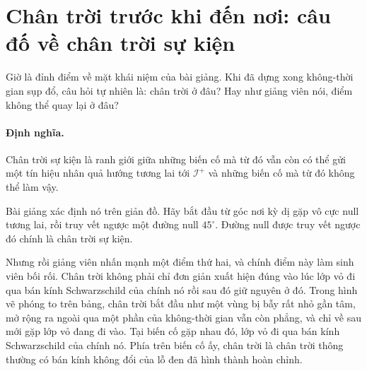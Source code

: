 \begin{classroomqa}
\end{classroomqa}

\section{Chân trời trước khi đến nơi: câu đố về chân trời sự kiện}

Giờ là đỉnh điểm về mặt khái niệm của bài giảng. Khi đã dựng xong không-thời gian sụp đổ, câu hỏi tự nhiên là: chân trời ở đâu? Hay như giảng viên nói, điểm không thể quay lại ở đâu?

\paragraph{Định nghĩa.} Chân trời sự kiện là ranh giới giữa những biến cố mà từ đó vẫn còn có thể gửi một tín hiệu nhân quả hướng tương lai tới \(\mathcal{I}^+\) và những biến cố mà từ đó không thể làm vậy.

Bài giảng xác định nó trên giản đồ. Hãy bắt đầu từ góc nơi kỳ dị gặp vô cực null tương lai, rồi truy vết ngược một đường null \(45^\circ\). Đường null được truy vết ngược đó chính là chân trời sự kiện.

Nhưng rồi giảng viên nhấn mạnh một điểm thứ hai, và chính điểm này làm sinh viên bối rối. Chân trời không phải chỉ đơn giản xuất hiện đúng vào lúc lớp vỏ đi qua bán kính Schwarzschild của chính nó rồi sau đó giữ nguyên ở đó. Trong hình vẽ phóng to trên bảng, chân trời bắt đầu như một vùng bị bẫy rất nhỏ gần tâm, mở rộng ra ngoài qua một phần của không-thời gian vẫn còn phẳng, và chỉ về sau mới gặp lớp vỏ đang đi vào. Tại biến cố gặp nhau đó, lớp vỏ đi qua bán kính Schwarzschild của chính nó. Phía trên biến cố ấy, chân trời là chân trời thông thường có bán kính không đổi của lỗ đen đã hình thành hoàn chỉnh.

